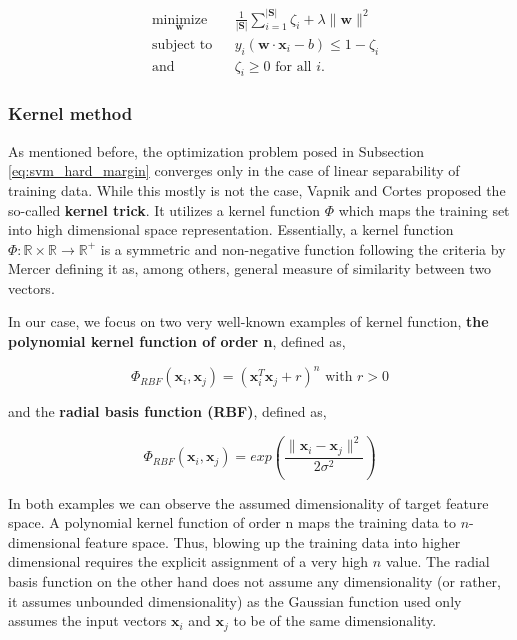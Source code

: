 \documentclass[pdftex,12pt,a4paper]{report}
\begin{document}
\begin{equation*}
\begin{aligned}
& \underset{\mathbf{
w}}{\text{minimize}}
& & \frac{1}{\vert \mathbf{S} \vert} \sum_{i=1}^{\vert \mathbf{S} \vert} \zeta_i + \lambda \| \mathbf{w} \|^2 \\
& \text{subject to}
& & y_i (\mathbf{w} \cdot \mathbf{x}_i - b) \leq 1 - \zeta_i \\
& \text{and} && \zeta_i \geq 0 \text{ for all } i.
\end{aligned}
\end{equation*}

\subsubsection*{Kernel method}

As mentioned before, the optimization problem posed in Subsection \ref{eq:svm_hard_margin} converges only in the case of linear separability of training data. While this mostly is not the case, Vapnik and Cortes \cite{cortes1995support} proposed the so-called \textbf{kernel trick}. It utilizes a kernel function $\Phi$ which maps the training set into high dimensional space representation. Essentially, a kernel function $\Phi: \mathbb{R} \times \mathbb{R} \rightarrow \mathbb{R}^+$ is a symmetric and non-negative function following the criteria by Mercer \cite{mercer1909functions} defining it as, among others, general measure of similarity between two vectors.

In our case, we focus on two very well-known examples of kernel function, \textbf{the polynomial kernel function of order n}, defined as,

\begin{equation}
\Phi_{RBF}(\mathbf{x}_i, \mathbf{x}_j) = \left(\mathbf{x}_i^T \mathbf{x}_j + r \right)^n \text{ with } r > 0
\label{eq:svm_quad}
\end{equation} 

and the \textbf{radial basis function (RBF)}, defined as,

\begin{equation}
\Phi_{RBF}(\mathbf{x}_i, \mathbf{x}_j) = exp\left(\frac{\| \mathbf{x}_i - \mathbf{x}_j \|^2}{2 \sigma^2}\right)
\label{eq:svm_rbf}
\end{equation}

In both examples we can observe the assumed dimensionality of target feature space. A polynomial kernel function of order n maps the training data to $n$-dimensional feature  space. Thus, blowing up the training data into higher dimensional requires the explicit assignment of a very high $n$ value. The  radial basis function on the other hand does not assume any dimensionality (or rather, it assumes unbounded dimensionality) as the Gaussian function used only assumes the input vectors $\mathbf{x}_i$ and $\mathbf{x}_j$ to be of the same dimensionality. 
\end{document}
